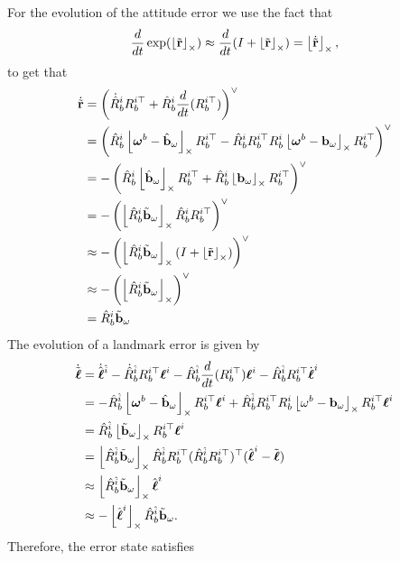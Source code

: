 For the evolution of the attitude error we use the fact that
\[
\frac{d}{dt}\exp(\left\lfloor\tilde{\mathbf{r}}\right\rfloor_{\times}) 
    \approx \frac{d}{dt}(I + \left\lfloor\tilde{\mathbf{r}}\right\rfloor_{\times}) = \left\lfloor\dot{\tilde{\mathbf{r}}}\right\rfloor_{\times},
\]
to get that 
\begin{align*}
    \dot{\tilde{\mathbf{r}}}
        &= \left(\dot{\hat{R}}_b^i R_b^{i\top} + \hat{R}_b^i\frac{d}{dt}(R_b^{i\top})\right)^\vee \\
        &= \left(\hat{R}_b^i\left\lfloor\boldsymbol{\omega}^b-\hat{\mathbf{b}}_\omega\right\rfloor_{\times} R_b^{i\top} - \hat{R}_b^iR_b^{i\top} R_b^i \left\lfloor\boldsymbol{\omega}^b-\mathbf{b}_\omega\right\rfloor_{\times} R_b^{i\top}\right)^\vee \\
        &= -\left(\hat{R}_b^i\left\lfloor\hat{\mathbf{b}}_\omega\right\rfloor_{\times} R_b^{i\top} + \hat{R}_b^i \left\lfloor\mathbf{b}_\omega\right\rfloor_{\times} R_b^{i\top}\right)^\vee \\
        &= -\left(\left\lfloor\hat{R}_b^i\tilde{\mathbf{b}}_\omega\right\rfloor_{\times} \hat{R}_b^i R_b^{i\top}\right)^\vee \\        
        &\approx -\left(\left\lfloor\hat{R}_b^i\tilde{\mathbf{b}}_\omega\right\rfloor_{\times} (I + \left\lfloor\tilde{\mathbf{r}}\right\rfloor_{\times})\right)^\vee \\
        &\approx -\left(\left\lfloor\hat{R}_b^i\tilde{\mathbf{b}}_\omega\right\rfloor_{\times} \right)^\vee \\
        &= \hat{R}_b^i\tilde{\mathbf{b}}_\omega
\end{align*}
The evolution of a landmark error is given by
\begin{align*}
    \dot{\tilde{\boldsymbol{\ell}}} &= \dot{\hat{\boldsymbol{\ell}}}^{\hat{i}}-\dot{\hat{R}}_b^{\hat{i}} R_b^{i\top}\boldsymbol{\ell}^i - \hat{R}_b^{\hat{i}}\frac{d}{dt}(R_b^{i\top}) \boldsymbol{\ell}^i - \hat{R}_b^{\hat{i}}R_b^{i\top} \dot{\boldsymbol{\ell}}^i \\
     &=  -\hat{R}_b^{\hat{i}}\left\lfloor\boldsymbol{\omega}^b-\hat{\mathbf{b}}_\omega\right\rfloor_{\times} R_b^{i\top} \boldsymbol{\ell}^i + \hat{R}_b^{\hat{i}} R_b^{i\top} R_b^i\left\lfloor\omega^b-\mathbf{b}_\omega\right\rfloor_{\times} R_b^{i\top} \boldsymbol{\ell}^i  \\
     &=  \hat{R}_b^{\hat{i}}\left\lfloor\tilde{\mathbf{b}}_\omega\right\rfloor_{\times} R_b^{i\top} \boldsymbol{\ell}^i  \\
     &=  \left\lfloor\hat{R}_b^{\hat{i}}\tilde{\mathbf{b}}_\omega\right\rfloor_{\times} \hat{R}_b^{\hat{i}}R_b^{i\top} (\hat{R}_b^{\hat{i}}R_b^{i\top})^\top (\hat{\boldsymbol{\ell}}^i - \tilde{\boldsymbol{\ell}})  \\
     &\approx  \left\lfloor\hat{R}_b^{\hat{i}}\tilde{\mathbf{b}}_\omega\right\rfloor_{\times} \hat{\boldsymbol{\ell}}^i  \\
     &\approx  -\left\lfloor\hat{\boldsymbol{\ell}}^i\right\rfloor_{\times} \hat{R}_b^{\hat{i}} \tilde{\mathbf{b}}_\omega.
\end{align*}
Therefore, the error state satisfies

